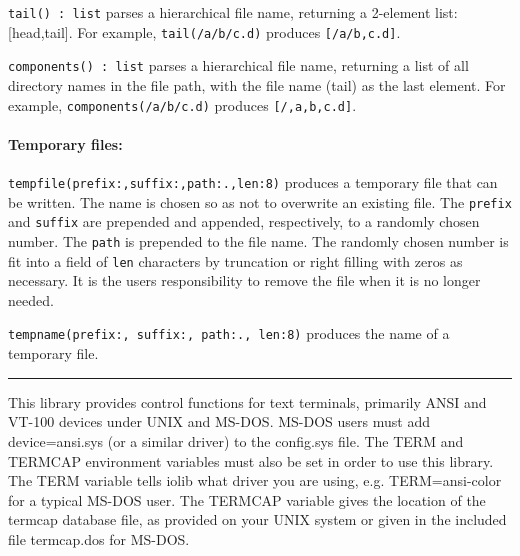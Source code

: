 \texttt{tail() : list} parses a hierarchical file name, returning a
2-element list: [head,tail]. For example,
\texttt{tail({\textquotedbl}/a/b/c.d{\textquotedbl})} produces
\texttt{[{\textquotedbl}/a/b{\textquotedbl},{\textquotedbl}c.d{\textquotedbl}]}.

\texttt{components() : list} parses a hierarchical file name, returning
a list of all directory names in the file path, with the file name
(tail) as the last element. For example,
\texttt{components({\textquotedbl}/a/b/c.d{\textquotedbl})} produces
\texttt{[{\textquotedbl}/{\textquotedbl},{\textquotedbl}a{\textquotedbl},{\textquotedbl}b{\textquotedbl},{\textquotedbl}c.d{\textquotedbl}]}.

\paragraph{Temporary files:}
\texttt{tempfile(prefix:{\textquotedbl}{\textquotedbl},suffix:{\textquotedbl}{\textquotedbl},path:{\textquotedbl}.{\textquotedbl},len:8)}
produces a temporary file that can be written. The name is chosen so as
not to overwrite an existing file. The \texttt{prefix} and
\texttt{suffix} are prepended and appended, respectively, to a randomly
chosen number. The \texttt{path} is prepended to the file name. The
randomly chosen number is fit into a field of \texttt{len} characters
by truncation or right filling with zeros as necessary. It is the
user{\textquotesingle}s responsibility to remove the file when it is no
longer needed.

\texttt{tempname(prefix:{\textquotedbl}{\textquotedbl},
suffix:{\textquotedbl}{\textquotedbl},
path:{\textquotedbl}.{\textquotedbl}, len:8)} produces the name of a
temporary file.

\vspace{0.25cm}\hrule{}

This library provides control functions for text terminals, primarily
ANSI and VT-100 devices under UNIX and MS-DOS. MS-DOS users must add
{\textquotedbl}device=ansi.sys{\textquotedbl} (or a similar driver) to
the config.sys file. The TERM and TERMCAP environment variables must also be set in order to use
this library. The TERM variable tells iolib what driver you are using,
e.g. TERM=ansi-color for a typical MS-DOS user. The TERMCAP variable
gives the location of the termcap database file, as provided on your
UNIX system or given in the included file termcap.dos for MS-DOS.

